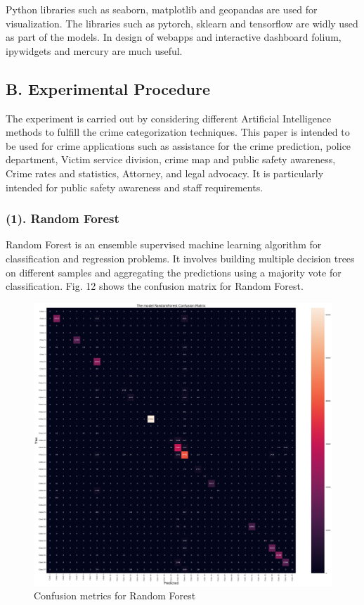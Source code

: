 \documentclass[11 pt,conference,final,]{IEEEtran}
\begin{document}
Python libraries such as seaborn, matplotlib and geopandas are used for
visualization. The libraries such as pytorch, sklearn and tensorflow are
widly used as part of the models. In design of webapps and interactive
dashboard folium, ipywidgets and mercury are much useful.

\subsection{B. Experimental Procedure}\label{b.-experimental-procedure}

The experiment is carried out by considering different Artificial
Intelligence methods to fulfill the crime categorization techniques.
This paper is intended to be used for crime applications such as
assistance for the crime prediction, police department, Victim service
division, crime map and public safety awareness, Crime rates and
statistics, Attorney, and legal advocacy. It is particularly intended
for public safety awareness and staff requirements.

\subsubsection{(1). Random Forest}\label{random-forest}

Random Forest is an ensemble supervised machine learning algorithm for
classification and regression problems. It involves building multiple
decision trees on different samples and aggregating the predictions
using a majority vote for classification. Fig. 12 shows the confusion
matrix for Random Forest.

\begin{figure}

{\centering \includegraphics[width=0.9\linewidth]{img/fig12} 

}

\caption{Confusion metrics for Random Forest}\label{fig:unnamed-chunk-12}
\end{figure}
\end{document}

